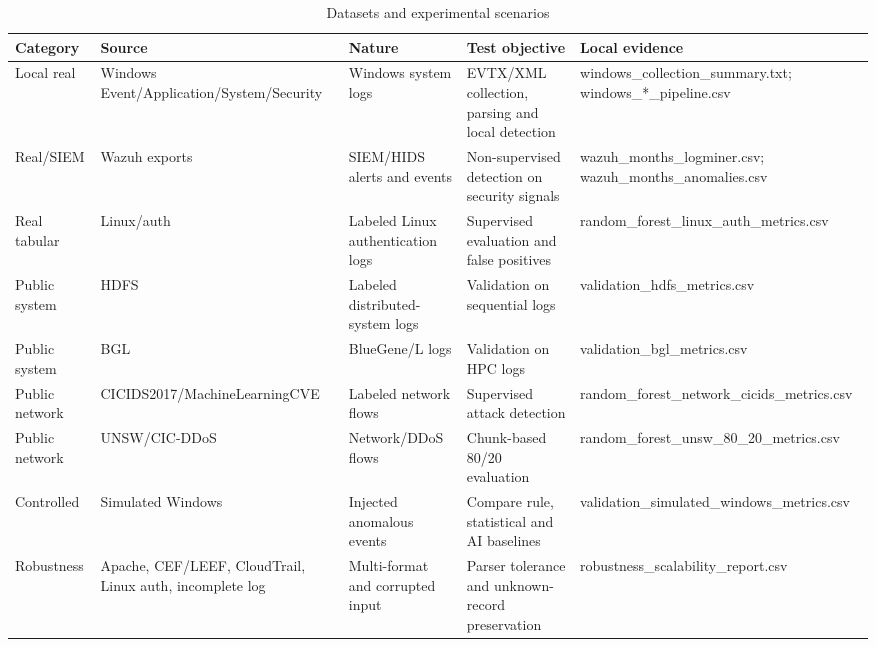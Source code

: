 \begin{table}[t]
\caption{Datasets and experimental scenarios}
\label{tab:datasets_scenarios}
\centering
\scriptsize
\begin{tabularx}{\textwidth}{p{2.2cm}p{3.0cm}p{2.7cm}X p{3.0cm}}
\toprule
\textbf{Category} & \textbf{Source} & \textbf{Nature} & \textbf{Test objective} & \textbf{Local evidence} \\
\midrule
Local real & Windows Event/Application/System/Security & Windows system logs & EVTX/XML collection, parsing and local detection & windows\_collection\_summary.txt; windows\_*\_pipeline.csv \\
Real/SIEM & Wazuh exports & SIEM/HIDS alerts and events & Non-supervised detection on security signals & wazuh\_months\_logminer.csv; wazuh\_months\_anomalies.csv \\
Real tabular & Linux/auth & Labeled Linux authentication logs & Supervised evaluation and false positives & random\_forest\_linux\_auth\_metrics.csv \\
Public system & HDFS & Labeled distributed-system logs & Validation on sequential logs & validation\_hdfs\_metrics.csv \\
Public system & BGL & BlueGene/L logs & Validation on HPC logs & validation\_bgl\_metrics.csv \\
Public network & CICIDS2017/MachineLearningCVE & Labeled network flows & Supervised attack detection & random\_forest\_network\_cicids\_metrics.csv \\
Public network & UNSW/CIC-DDoS & Network/DDoS flows & Chunk-based 80/20 evaluation & random\_forest\_unsw\_80\_20\_metrics.csv \\
Controlled & Simulated Windows & Injected anomalous events & Compare rule, statistical and AI baselines & validation\_simulated\_windows\_metrics.csv \\
Robustness & Apache, CEF/LEEF, CloudTrail, Linux auth, incomplete log & Multi-format and corrupted input & Parser tolerance and unknown-record preservation & robustness\_scalability\_report.csv \\
\bottomrule
\end{tabularx}
\end{table}
